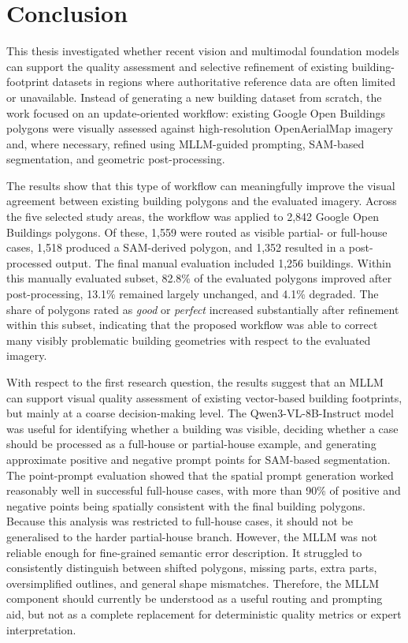 \chapter{Conclusion}
\label{ch:conclusion}

This thesis investigated whether recent vision and multimodal foundation models can support the quality assessment and selective refinement of existing building-footprint datasets in regions where authoritative reference data are often limited or unavailable. Instead of generating a new building dataset from scratch, the work focused on an update-oriented workflow: existing Google Open Buildings polygons were visually assessed against high-resolution OpenAerialMap imagery and, where necessary, refined using MLLM-guided prompting, SAM-based segmentation, and geometric post-processing.

The results show that this type of workflow can meaningfully improve the visual agreement between existing building polygons and the evaluated imagery. Across the five selected study areas, the workflow was applied to 2,842 Google Open Buildings polygons. Of these, 1,559 were routed as visible partial- or full-house cases, 1,518 produced a SAM-derived polygon, and 1,352 resulted in a post-processed output. The final manual evaluation included 1,256 buildings. Within this manually evaluated subset, 82.8\% of the evaluated polygons improved after post-processing, 13.1\% remained largely unchanged, and 4.1\% degraded. The share of polygons rated as \textit{good} or \textit{perfect} increased substantially after refinement within this subset, indicating that the proposed workflow was able to correct many visibly problematic building geometries with respect to the evaluated imagery.

With respect to the first research question, the results suggest that an MLLM can support visual quality assessment of existing vector-based building footprints, but mainly at a coarse decision-making level. The Qwen3-VL-8B-Instruct model was useful for identifying whether a building was visible, deciding whether a case should be processed as a full-house or partial-house example, and generating approximate positive and negative prompt points for SAM-based segmentation. The point-prompt evaluation showed that the spatial prompt generation worked reasonably well in successful full-house cases, with more than 90\% of positive and negative points being spatially consistent with the final building polygons. Because this analysis was restricted to full-house cases, it should not be generalised to the harder partial-house branch. However, the MLLM was not reliable enough for fine-grained semantic error description. It struggled to consistently distinguish between shifted polygons, missing parts, extra parts, oversimplified outlines, and general shape mismatches. Therefore, the MLLM component should currently be understood as a useful routing and prompting aid, but not as a complete replacement for deterministic quality metrics or expert interpretation.

